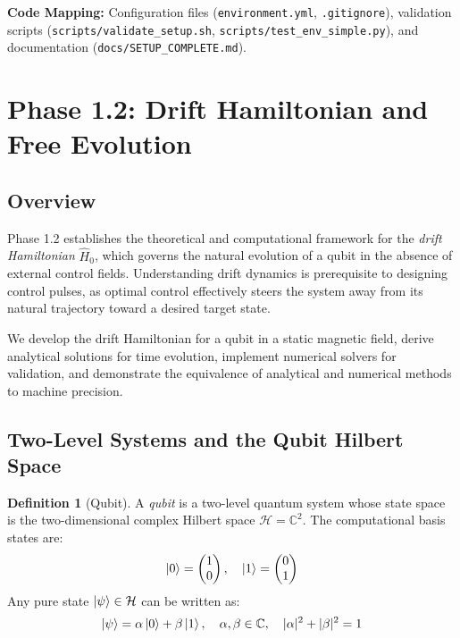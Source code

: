 \documentclass[11pt,a4paper]{article}
\theoremstyle{definition}
\newtheorem{definition}{Definition}[section]
\theoremstyle{remark}
\newcommand{\hilbert}{\mathcal{H}}
\newcommand{\CC}{\mathbb{C}}
\begin{document}
\textbf{Code Mapping:} Configuration files (\texttt{environment.yml}, \texttt{.gitignore}), validation scripts (\texttt{scripts/validate\_setup.sh}, \texttt{scripts/test\_env\_simple.py}), and documentation (\texttt{docs/SETUP\_COMPLETE.md}).

\section{Phase 1.2: Drift Hamiltonian and Free Evolution}
\label{sec:phase1.2}

\subsection{Overview}

Phase 1.2 establishes the theoretical and computational framework for the \emph{drift Hamiltonian} $\hat{H}_0$, which governs the natural evolution of a qubit in the absence of external control fields. Understanding drift dynamics is prerequisite to designing control pulses, as optimal control effectively steers the system away from its natural trajectory toward a desired target state.

We develop the drift Hamiltonian for a qubit in a static magnetic field, derive analytical solutions for time evolution, implement numerical solvers for validation, and demonstrate the equivalence of analytical and numerical methods to machine precision.

\subsection{Two-Level Systems and the Qubit Hilbert Space}

\begin{definition}[Qubit]
A \emph{qubit} is a two-level quantum system whose state space is the two-dimensional complex Hilbert space $\hilbert = \CC^2$. The computational basis states are:
\begin{equation}
\ket{0} = \begin{pmatrix} 1 \\ 0 \end{pmatrix}, \quad
\ket{1} = \begin{pmatrix} 0 \\ 1 \end{pmatrix}
\end{equation}
Any pure state $\ket{\psi} \in \hilbert$ can be written as:
\begin{equation}
\ket{\psi} = \alpha \ket{0} + \beta \ket{1}, \quad \alpha, \beta \in \CC, \quad |\alpha|^2 + |\beta|^2 = 1
\end{equation}
\end{definition}
\end{document}
